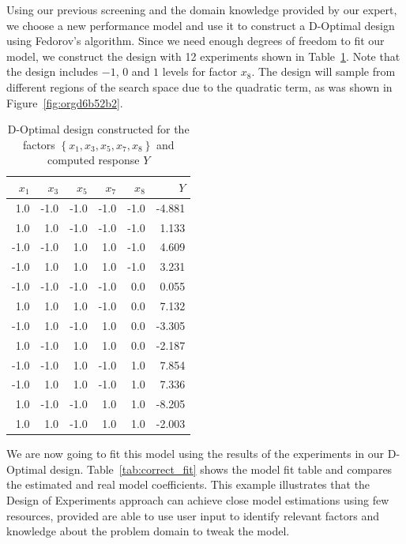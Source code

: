 \documentclass[conference]{IEEEtran}
\begin{document}
Using our previous screening and the domain knowledge provided by our expert, we
choose a new performance model and use it to construct a D-Optimal design using
Fedorov's algorithm. Since we need enough degrees of freedom to fit our model,
we construct the design with 12 experiments shown in Table~\ref{tab:d_optimal}.
Note that the design includes \(-1\), \(0\) and \(1\) levels for factor \(x_8\). The design
will sample from different regions of the search space due to the quadratic term,
as was shown in Figure~\ref{fig:orgd6b52b2}.

\begin{table}[ht]
\centering
\caption{D-Optimal design constructed for the factors $\left\{x_1,x_3,x_5,x_7,x_8\right\}$ and computed response $Y$}
\label{tab:d_optimal}
\begingroup\footnotesize
\begin{tabular}{rrrrrr}
  \toprule
$x_1$ & $x_3$ & $x_5$ & $x_7$ & $x_8$ & $Y$ \\
  \midrule
1.0 & -1.0 & -1.0 & -1.0 & -1.0 & -4.881 \\
  1.0 & 1.0 & -1.0 & -1.0 & -1.0 & 1.133 \\
  -1.0 & -1.0 & 1.0 & 1.0 & -1.0 & 4.609 \\
  -1.0 & 1.0 & 1.0 & 1.0 & -1.0 & 3.231 \\
  -1.0 & -1.0 & -1.0 & -1.0 & 0.0 & 0.055 \\
  1.0 & 1.0 & 1.0 & -1.0 & 0.0 & 7.132 \\
  -1.0 & 1.0 & -1.0 & 1.0 & 0.0 & -3.305 \\
  1.0 & -1.0 & 1.0 & 1.0 & 0.0 & -2.187 \\
  -1.0 & -1.0 & 1.0 & -1.0 & 1.0 & 7.854 \\
  -1.0 & 1.0 & 1.0 & -1.0 & 1.0 & 7.336 \\
  1.0 & -1.0 & -1.0 & 1.0 & 1.0 & -8.205 \\
  1.0 & 1.0 & -1.0 & 1.0 & 1.0 & -2.003 \\
   \bottomrule
\end{tabular}
\endgroup
\end{table}

We are now going to fit this model using the results of the experiments in our
D-Optimal design. Table~\ref{tab:correct_fit} shows the model fit table
and compares the estimated and real model coefficients. This example illustrates
that the Design of Experiments approach can achieve close model estimations
using few resources, provided are able to use user input to identify relevant
factors and knowledge about the problem domain to tweak the model.
\end{document}
